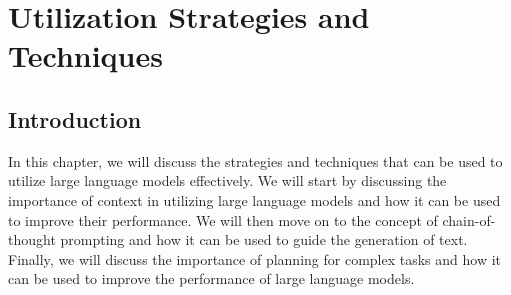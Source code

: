 
\chapter{Utilization Strategies and Techniques}
\label{ch:utilization}

\section{Introduction}
\label{sec:ch3-introduction}

In this chapter, we will discuss the strategies and techniques that can be used to utilize large language models effectively.
We will start by discussing the importance of context in utilizing large language models and how it can be used to improve their performance.
We will then move on to the concept of chain-of-thought prompting and how it can be used to guide the generation of text.
Finally, we will discuss the importance of planning for complex tasks and how it can be used to improve the performance of large language models.

